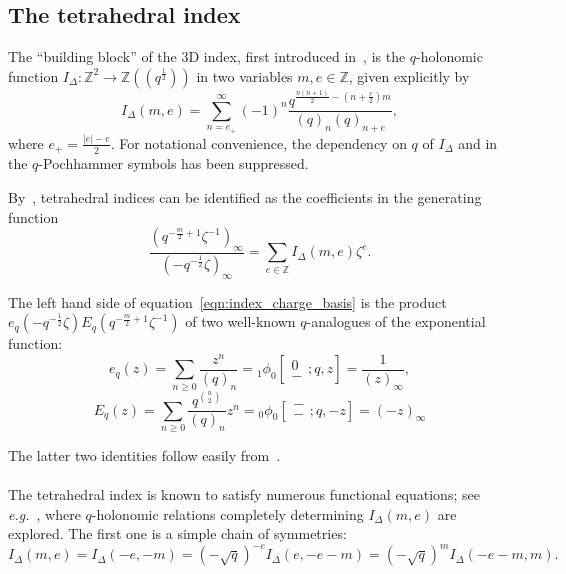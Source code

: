 \documentclass[11pt]{amsart}
\newcommand{\Z}{\mathbb{Z}}
\newcommand{\tet}{I_{\Delta}}
\begin{document}
\subsection{The tetrahedral index}\label{ssec:tet_index}

The ``building block'' of the $3$D index, first introduced in~\cite{dimofte20133}, is the $q$-holonomic function $I_\Delta \colon \Z^2 \longrightarrow \Z(\!(q^{\frac12})\!)$ in two variables $m,e \in \Z$, given explicitly by
\begin{equation}\label{eqn:tetrahedral_index}
I_\Delta \left(m,e\right) = \sum_{n = e_+}^\infty \left(-1\right)^n \frac{q^{\frac{n\left(n+1\right)}{2} - \left(n +\frac{e}{2} \right)m}}{\left(q\right)_n \left(q\right)_{n+e}},
\end{equation}
where $e_+ = \frac{|e| - e}{2}$. For notational convenience, the dependency on $q$ of $\tet$ and in the $q$-Pochhammer symbols has been suppressed.

By~\cite[Sec.~3.1]{dimofte20133}, tetrahedral indices can be identified as the coefficients in the generating function
\begin{equation}\label{eqn:index_charge_basis}
\frac{\left(q^{-\frac{m}{2} +1} \zeta^{-1}\right)_\infty}{\left(-q^{-\frac12} \zeta\right)_\infty} = \sum_{e \in \Z} I_\Delta \left(m,e\right) \zeta^e.
\end{equation}

The left hand side of equation~\eqref{eqn:index_charge_basis} is the product $e_q\left(-q^{-\frac12} \zeta\right) E_q\left(q^{-\frac{m}{2} +1} \zeta^{-1}\right)$ of two well-known $q$-analogues of the exponential function:
\begin{equation}\label{eqn:exp1}
e_q\left(z\right) = \sum_{n \ge 0} \frac{z^n}{\left(q\right)_n} = {_1 \phi_0} \left[ \begin{matrix}
0\\ -
\end{matrix};q,z\right] = \frac{1}{\left(z\right)_\infty},
\end{equation}
\begin{equation}\label{eqn:exp2}
E_q\left(z\right) = \sum_{n \ge 0} \frac{q^{\binom{n}{2}}}{\left(q\right)_n}z^n = {_0\phi_0}\left[ \begin{matrix}
-\\ -
\end{matrix};q,-z\right]= \left(-z\right)_\infty
\end{equation}

The latter two identities follow easily from~\cite[Sec.~1.3]{GasperRahman}.\\~\\
The tetrahedral index is known to satisfy numerous functional equations; see \emph{e.g.}~\cite{garoufalidis20163d_angle}, where $q$-holonomic relations completely determining $\tet(m,e)$ are explored. The first one is a simple chain of symmetries:
\begin{equation}\label{eqn:tetrahedral_index_symmetries}
\tet \left(m,e\right)  = \tet \left(-e,-m\right) =  \left(-\sqrt{q}\right)^{-e} \tet\left(e,-e-m\right) = \left(-\sqrt{q}\right)^{m} \tet\left(-e-m,m\right).
\end{equation}
\end{document}
